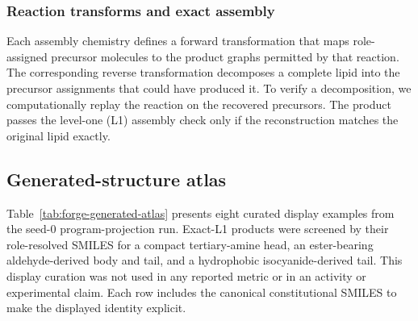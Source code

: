 \documentclass{article}
\theoremstyle{definition}
\begin{document}
\subsubsection{Reaction transforms and exact assembly}

Each assembly chemistry defines a forward transformation that maps role-assigned precursor
molecules to the product graphs permitted by that reaction.
The corresponding reverse transformation decomposes a complete lipid into the precursor
assignments that could have produced it.
To verify a decomposition, we computationally replay the reaction on the recovered precursors.
The product passes the level-one (L1) assembly check only if the reconstruction matches the original
lipid exactly.

\clearpage

\subsection{Generated-structure atlas}
\label{app:generated-examples}
\label{app:atlas}

Table~\ref{tab:forge-generated-atlas} presents eight curated display examples from the
seed-0 program-projection run. Exact-L1 products were screened by their role-resolved
SMILES for a compact tertiary-amine head, an ester-bearing aldehyde-derived body and tail,
and a hydrophobic isocyanide-derived tail. This display curation was not used in any
reported metric or in an activity or experimental claim.
Each row includes the canonical constitutional SMILES to make the displayed identity explicit.
\end{document}
